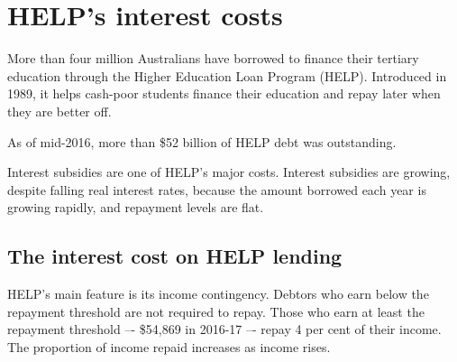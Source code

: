\documentclass{grattan}
\begin{document}


\chapter[HELP's interest costs]{\gls{HELP}'s interest costs}\label{chap:2-helps-interest-costs}

More than four million Australians have borrowed to finance their tertiary education through the Higher Education Loan Program (\gls{HELP}).
Introduced in 1989, it helps cash-poor students finance their education and repay later when they are better off. 

As of mid-2016, more than \$52 billion of \gls{HELP} debt was outstanding. 

Interest subsidies are one of \gls{HELP}'s major costs.
Interest subsidies are growing, despite falling real interest rates, because the amount borrowed each year is growing rapidly, and repayment levels are flat.

\section{The interest cost on \gls{HELP} lending}\label{sec:cpi-versus-the-governments-cost-of-borrowing}

\gls{HELP}’s main feature is its income contingency.
Debtors who earn below the repayment threshold are not required to repay. 
Those who earn at least the repayment threshold –- \$54,869 in 2016-17 –- repay 4 per cent of their income. 
The proportion of income repaid increases as income rises. 
\end{document}
